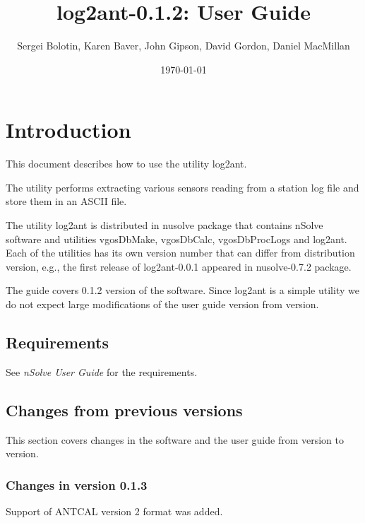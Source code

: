 \documentclass [10pt,letterpaper]{report}
\newcommand{\nuSolve}{\greektext n\latintext Solve}
\newcommand{\thisVersion}{0.1.2}
\begin{document}
\title{log2ant-\thisVersion{}: User Guide}

\author{
Sergei Bolotin,
Karen Baver,
John Gipson,
David Gordon,
Daniel MacMillan
}

\date{\today}


\maketitle

\tableofcontents

\def\leftSp      {48mm}
\def\riteSp     {113mm}



\chapter{Introduction}
\label{intro}

This document describes how to use the utility log2ant.

The utility performs extracting various sensors reading from a station log
file and store them in an ASCII file.

The utility log2ant is distributed in nusolve package that contains \nuSolve{}
software and utilities vgosDbMake, vgosDbCalc, vgosDbProcLogs and log2ant. Each of the
utilities has its own version number that can differ from distribution version,
e.g., the first release of log2ant-0.0.1 appeared in nusolve-0.7.2 package.

The guide covers \thisVersion{} version of the software. Since log2ant
is a simple utility we do not expect large modifications of the
user guide version from version.

\section{Requirements}
\label{intro_reqs}

See \emph{\nuSolve{} User Guide} for the requirements.


\section{Changes from previous versions}
\label{intro_changes}

This section covers changes in the software and the user guide from version to version.


\subsection{Changes in version 0.1.3}
Support of ANTCAL version 2 format was added.
\end{document}
